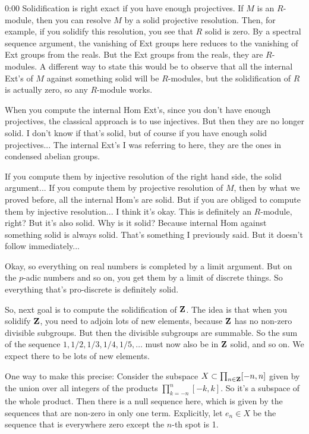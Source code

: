 \begin{unfinished}{0:00}
Solidification is right exact if you have enough projectives. If $M$ is an $R$-module, then you can resolve $M$ by a solid projective resolution. Then, for example, if you solidify this resolution, you see that $R$ solid is zero. By a spectral sequence argument, the vanishing of Ext groups here reduces to the vanishing of Ext groups from the reals. But the Ext groups from the reals, they are $R$-modules. A different way to state this would be to observe that all the internal Ext's of $M$ against something solid will be $R$-modules, but the solidification of $R$ is actually zero, so any $R$-module works.

When you compute the internal Hom Ext's, since you don't have enough projectives, the classical approach is to use injectives. But then they are no longer solid. I don't know if that's solid, but of course if you have enough solid projectives... The internal Ext's I was referring to here, they are the ones in condensed abelian groups.

If you compute them by injective resolution of the right hand side, the solid argument... If you compute them by projective resolution of $M$, then by what we proved before, all the internal Hom's are solid. But if you are obliged to compute them by injective resolution... I think it's okay. This is definitely an $R$-module, right? But it's also solid. Why is it solid? Because internal Hom against something solid is always solid. That's something I previously said. But it doesn't follow immediately...

Okay, so everything on real numbers is completed by a limit argument. But on the $p$-adic numbers and so on, you get them by a limit of discrete things. So everything that's pro-discrete is definitely solid.

So, next goal is to compute the solidification of $\mathbf Z$. The idea is that when you solidify $\mathbf Z$, you need to adjoin lots of new elements, because $\mathbf Z$ has no non-zero divisible subgroups. But then the divisible subgroups are summable. So the sum of the sequence $1, 1/2, 1/3, 1/4, 1/5, \dots$ must now also be in $\mathbf Z$ solid, and so on. We expect there to be lots of new elements.

One way to make this precise: Consider the subspace $X \subset \prod_{n \in \mathbf Z} [-n,n]$ given by the union over all integers of the products $\prod_{k=-n}^n [-k,k]$. So it's a subspace of the whole product. Then there is a null sequence here, which is given by the sequences that are non-zero in only one term. Explicitly, let $e_n \in X$ be the sequence that is everywhere zero except the $n$-th spot is 1.


\end{unfinished}
